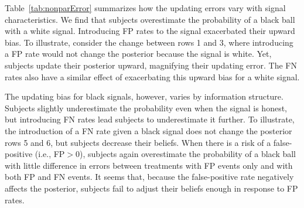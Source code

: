 \documentclass[12pt,a4paper]{article}
\begin{document}
\begin{figure}[H]
	\hfill
	\hfill
\end{figure}

Table~\ref{tab:nonparError} summarizes how the updating errors vary with signal characteristics. We find that subjects overestimate the probability of a black ball with a white signal. Introducing FP rates to the signal exacerbated their upward bias. To illustrate, consider the change between rows 1 and 3, where introducing a FP rate would not change the posterior because the signal is white. Yet, subjects update their posterior upward, magnifying their updating error. The FN rates also have a similar effect of exacerbating this upward bias for a white signal.

The updating bias for black signals, however, varies by information structure. Subjects slightly underestimate the probability even when the signal is honest, but introducing FN rates lead subjects to underestimate it further. To illustrate, the introduction of a FN rate given a black signal does not change the posterior rows 5 and 6, but subjects decrease their beliefs. When there is a risk of a false-positive (i.e., FP$>$0), subjects again overestimate the probability of a black ball with little difference in errors between treatments with FP events only and with both FP and FN events. It seems that, because the false-positive rate negatively affects the posterior, subjects fail to adjust their beliefs enough in response to FP rates.



\end{document}
